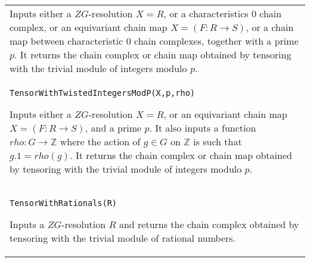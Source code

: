 \documentclass[a4paper,11pt]{report}
\begin{document}
{\begin{center}
\begin{tabular}{|l|}
 Inputs either a $ZG$-resolution $X=R$, or a characteristics 0 chain complex, or an equivariant chain map $X = (F:R \longrightarrow S)$, or a chain map between characteristic 0 chain complexes, together with a
prime $p$. It returns the chain complex or chain map obtained by tensoring with the
trivial module of integers modulo $p$. \\
 \index{TensorWithTwistedIntegersModP} \texttt{TensorWithTwistedIntegersModP(X,p,rho)} 

 Inputs either a $ZG$-resolution $X=R$, or an equivariant chain map $X = (F:R \longrightarrow S)$, and a prime $p$. It also inputs a function $rho\colon G\rightarrow \mathbb Z$ where the action of $g \in G$ on $\mathbb Z$ is such that $g.1 = rho(g)$. It returns the chain complex or chain map obtained by tensoring with the
trivial module of integers modulo $p$. \\
 \index{TensorWithRationals} \texttt{TensorWithRationals(R)} 

 Inputs a $ZG$-resolution $R$ and returns the chain complex obtained by tensoring with the trivial module of
rational numbers. \\
\end{tabular}\\[2mm]
\end{center}

 }

 
\end{document}
